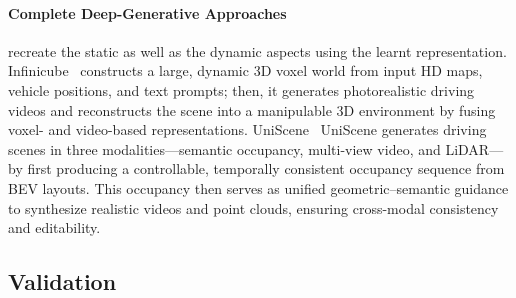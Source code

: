 \documentclass{article}
\begin{document}
\paragraph{Complete Deep-Generative Approaches} recreate the static as well as the dynamic aspects using the learnt representation. Infinicube~\cite{lu2024infinicube} constructs a large, dynamic 3D voxel world from input HD maps, vehicle positions, and text prompts; then, it generates photorealistic driving videos and reconstructs the scene into a manipulable 3D environment by fusing voxel- and video-based representations. UniScene~\cite{li2025uniscene} UniScene generates driving scenes in three modalities—semantic occupancy, multi-view video, and LiDAR—by first producing a controllable, temporally consistent occupancy sequence from BEV layouts. This occupancy then serves as unified geometric–semantic guidance to synthesize realistic videos and point clouds, ensuring cross-modal consistency and editability.


\subsection{Validation}
\end{document}
